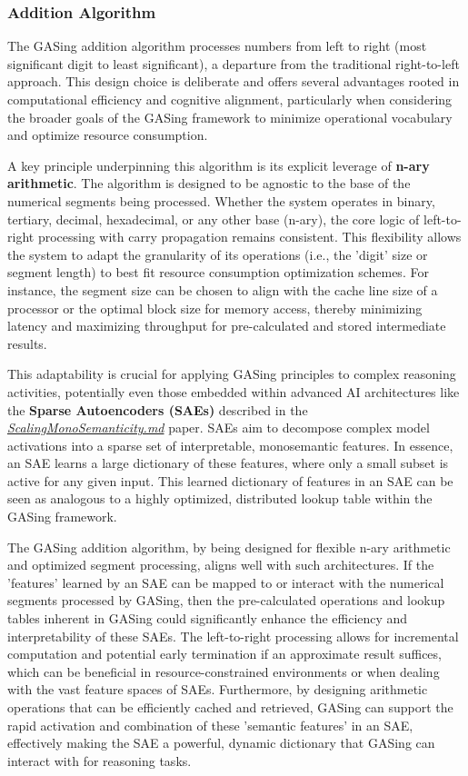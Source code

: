 \subsubsection{Addition Algorithm}

The GASing addition algorithm processes numbers from left to right (most significant digit to least significant), a departure from the traditional right-to-left approach. This design choice is deliberate and offers several advantages rooted in computational efficiency and cognitive alignment, particularly when considering the broader goals of the GASing framework to minimize operational vocabulary and optimize resource consumption.

A key principle underpinning this algorithm is its explicit leverage of \textbf{n-ary arithmetic}. The algorithm is designed to be agnostic to the base of the numerical segments being processed. Whether the system operates in binary, tertiary, decimal, hexadecimal, or any other base (n-ary), the core logic of left-to-right processing with carry propagation remains consistent. This flexibility allows the system to adapt the granularity of its operations (i.e., the 'digit' size or segment length) to best fit resource consumption optimization schemes. For instance, the segment size can be chosen to align with the cache line size of a processor or the optimal block size for memory access, thereby minimizing latency and maximizing throughput for pre-calculated and stored intermediate results.

This adaptability is crucial for applying GASing principles to complex reasoning activities, potentially even those embedded within advanced AI architectures like the \textbf{Sparse Autoencoders (SAEs)} described in the \textit{\href{file://\/Users/bkoo/Documents/Development/AIProjects/GASing\_PKM/docs/references/ScalingMonoSemanticity.md}{ScalingMonoSemanticity.md}} paper. SAEs aim to decompose complex model activations into a sparse set of interpretable, monosemantic features. In essence, an SAE learns a large dictionary of these features, where only a small subset is active for any given input. This learned dictionary of features in an SAE can be seen as analogous to a highly optimized, distributed lookup table within the GASing framework. 

The GASing addition algorithm, by being designed for flexible n-ary arithmetic and optimized segment processing, aligns well with such architectures. If the 'features' learned by an SAE can be mapped to or interact with the numerical segments processed by GASing, then the pre-calculated operations and lookup tables inherent in GASing could significantly enhance the efficiency and interpretability of these SAEs. The left-to-right processing allows for incremental computation and potential early termination if an approximate result suffices, which can be beneficial in resource-constrained environments or when dealing with the vast feature spaces of SAEs. Furthermore, by designing arithmetic operations that can be efficiently cached and retrieved, GASing can support the rapid activation and combination of these 'semantic features' in an SAE, effectively making the SAE a powerful, dynamic dictionary that GASing can interact with for reasoning tasks.

